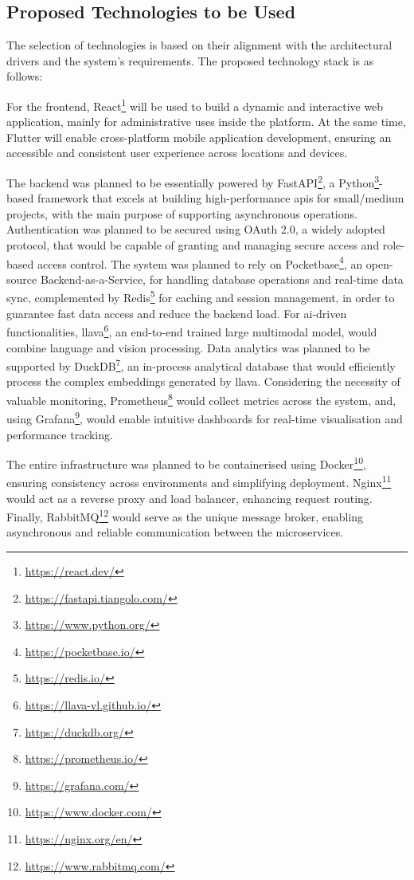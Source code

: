 
\subsection{Proposed Technologies to be Used}

The selection of technologies is based on their alignment with the architectural drivers and the system's requirements. The proposed technology stack is as follows:

For the frontend, React\footnote{\url{https://react.dev/}} will be used to build a dynamic and interactive web application, mainly for administrative uses inside the platform. At the same time, Flutter will enable cross-platform mobile application development, ensuring an accessible and consistent user experience across locations and devices.

The backend was planned to be essentially powered by FastAPI\footnote{\url{https://fastapi.tiangolo.com/}}, a Python\footnote{\url{https://www.python.org/}}-based framework that excels at building high-performance \acp{api} for small/medium projects, with the main purpose of supporting asynchronous operations. Authentication was planned to be secured using OAuth 2.0, a widely adopted protocol, that would be capable of granting and managing secure access and role-based access control. The system was planned to rely on Pocketbase\footnote{\url{https://pocketbase.io/}}, an open-source Backend-as-a-Service, for handling database operations and real-time data sync, complemented by Redis\footnote{\url{https://redis.io/}} for caching and session management, in order to guarantee fast data access and reduce the backend load. For \ac{ai}-driven functionalities, \ac{llava}\footnote{\url{https://llava-vl.github.io/}}, an end-to-end trained large multimodal model, would combine language and vision processing. Data analytics was planned to be supported by DuckDB\footnote{\url{https://duckdb.org/}}, an in-process analytical database that would efficiently process the complex embeddings generated by \ac{llava}. Considering the necessity of valuable monitoring, Prometheus\footnote{\url{https://prometheus.io/}} would collect metrics across the system, and, using Grafana\footnote{\url{https://grafana.com/}}, would enable intuitive dashboards for real-time visualisation and performance tracking. 

The entire infrastructure was planned to be containerised using Docker\footnote{\url{https://www.docker.com/}}, ensuring consistency across environments and simplifying deployment. Nginx\footnote{\url{https://nginx.org/en/}} would act as a reverse proxy and load balancer, enhancing request routing. Finally, RabbitMQ\footnote{\url{https://www.rabbitmq.com/}} would serve as the unique message broker, enabling asynchronous and reliable communication between the microservices.

